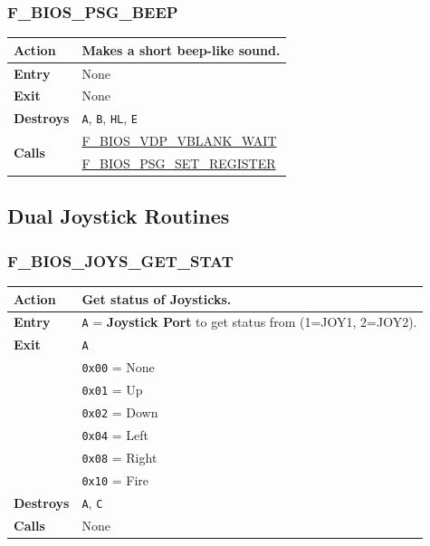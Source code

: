 \documentclass[a4paper,11pt]{article}
\begin{document}
        \subsubsection{F\_BIOS\_PSG\_BEEP}
        \label{func:fbiospsgbeep}
        \begin{tabular}{l p{9cm}}
            \hline\textbf{Action} & Makes a short beep-like sound. \\
            \hline\textbf{Entry} & None\\
            \hline\textbf{Exit} & None\\
            \hline\textbf{Destroys} & \texttt{A}, \texttt{B}, \texttt{HL},
            \texttt{E} \\
            \hline\multirow[t]{2}{4em}{\textbf{Calls}}
            & \hyperref[func:fbiosvdpvblankwait]{F\_BIOS\_VDP\_VBLANK\_WAIT}\\
            & \hyperref[func:fbiospsgsetregister]{F\_BIOS\_PSG\_SET\_REGISTER}\\
            \hline
        \end{tabular}

    \subsection{Dual Joystick Routines}

        \subsubsection{F\_BIOS\_JOYS\_GET\_STAT}
        \label{func:fbiosjoysgetstat}
        \begin{tabular}{l p{9cm}}
            \hline\textbf{Action}
            & Get status of Joysticks. \\
            \hline\textbf{Entry} & \texttt{A} = \textbf{Joystick Port} to get
            status from (1=JOY1, 2=JOY2).\\
            \hline\textbf{Exit} & \texttt{A}\\
            & \texttt{0x00} = None\\
            & \texttt{0x01} = Up\\
            & \texttt{0x02} = Down\\
            & \texttt{0x04} = Left\\
            & \texttt{0x08} = Right\\
            & \texttt{0x10} = Fire\\
            \hline\textbf{Destroys} & \texttt{A}, \texttt{C} \\
            \hline\textbf{Calls} & None\\
            \hline
        \end{tabular}
\end{document}

